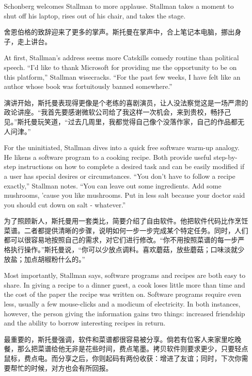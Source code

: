 \ifdefined\eng
Schonberg welcomes Stallman to more applause. Stallman takes a moment to shut off his laptop, rises out of his chair, and takes the stage.
\fi

\ifdefined\chs
舍恩伯格的致辞迎来了更多的掌声。斯托曼在掌声中，合上笔记本电脑，挪出身子，走上讲台。
\fi

\ifdefined\eng
At first, Stallman's address seems more Catskills comedy routine than political speech. ``I'd like to thank Microsoft for providing me the opportunity to be on this platform,'' Stallman wisecracks. ``For the past few weeks, I have felt like an author whose book was fortuitously banned somewhere.''
\fi

\ifdefined\chs
演讲开始，斯托曼表现得更像是个老练的喜剧演员，让人没法察觉这是一场严肃的政论讲座。``我首先要感谢微软公司给了我这样一次机会，来到贵校，畅抒己见。''斯托曼玩笑道，``过去几周里，我都觉得自己像个没落作家，自己的作品都无人问津。''
\fi

\ifdefined\eng
For the uninitiated, Stallman dives into a quick free software warm-up analogy. He likens a software program to a cooking recipe. Both provide useful step-by-step instructions on how to complete a desired task and can be easily modified if a user has special desires or circumstances. ``You don't have to follow a recipe exactly,'' Stallman notes. ``You can leave out some ingredients. Add some mushrooms, 'cause you like mushrooms. Put in less salt because your doctor said you should cut down on salt - whatever.''
\fi

\ifdefined\chs
为了照顾新人，斯托曼用一套类比，简要介绍了自由软件。他把软件代码比作烹饪菜谱。二者都提供清晰的步骤，说明如何一步一步完成某个特定任务。同时，人们都可以很容易地按照自己的需求，对它们进行修改。``你不用按照菜谱的每一步严格执行操作。''斯托曼说，``你可以少放点调料。喜欢蘑菇，放些蘑菇；口味淡就少放盐；加点胡椒粉什么的。''
\fi

\ifdefined\eng
Most importantly, Stallman says, software programs and recipes are both easy to share. In giving a recipe to a dinner guest, a cook loses little more than time and the cost of the paper the recipe was written on. Software programs require even less, usually a few mouse-clicks and a modicum of electricity. In both instances, however, the person giving the information gains two things: increased friendship and the ability to borrow interesting recipes in return.
\fi

\ifdefined\chs
最重要的，斯托曼强调，软件和菜谱都很容易被分享。倘若有位客人来家里吃晚餐，那么把菜谱给他无非是花些时间，费点笔墨。拷贝软件则要求更少，只要轻点鼠标，费点电。而分享之后，你则起码有两份收获：增进了友谊；同时，下次你需要帮忙的时候，对方也会有所回报。
\fi

